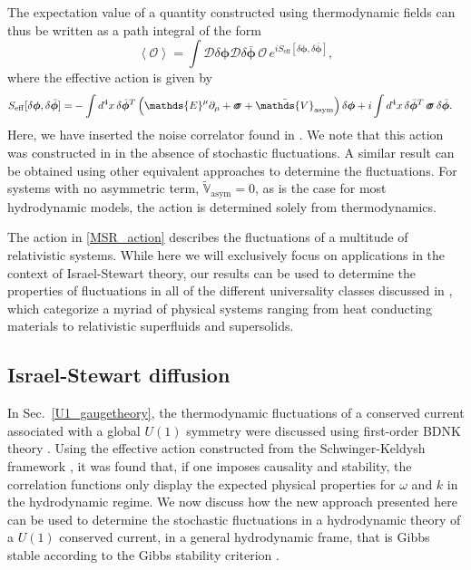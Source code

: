 \documentclass[aps,prd,nofootinbib,amsmath,amssymb,showpacs,longbibliography,singlecolumn,superscriptaddress,notitlepage]{revtex4-1}
\theoremstyle{plain}
\theoremstyle{definition}
\newcommand*{\Scale}[2][4]{\scalebox{#1}{$#2$}}%
\newcommand{\forceds}[1]{\Scale[1.1]{\ensuremath{\mathrlap{{{#1}}}\hspace{1.4pt}#1}}}
\newcommand{\cvec}[1]{\ensuremath{\bm {#1}}}
\newcommand{\cmat}[1]{\ensuremath{\mathds{{#1}}}}
\newcommand{\cmatgreek}[1]{\ensuremath{\forceds{{#1}}}}
\begin{document}
The expectation value of a quantity constructed using thermodynamic fields can thus be written as a path integral of the form 
\begin{equation}
    \left\langle \mathcal{O} \right\rangle = \int \mathcal{D} \delta \cvec{\phi} \mathcal{D} \delta \bar{\cvec{\phi}} \,\mathcal{O} \,e^{i S_{\mathrm{eff}}[\delta \cvec{\phi}, \delta \bar{\cvec{\phi}}]} ,
\end{equation}
where the effective action is given by 
\begin{equation} \label{MSR_action}
\begin{split}
    S_{\mathrm{eff}}[\delta \cvec{\phi}, \delta \bar{\cvec{\phi}}] = & -\int d^4x \,\delta \Bar{\cvec{\phi}}^T \left( \cmat{E}^{\mu} \partial_{\mu} + \cmatgreek{\sigma} + \tilde{\cmat{V}}_{\mathrm{asym}} \right) \delta \cvec{\phi} + i \int d^4x \,\delta \Bar{\cvec{\phi}}^T \,\cmatgreek{\sigma}\, \delta \bar{\cvec{\phi}} .
\end{split}
\end{equation}
Here, we have inserted the noise correlator found in \cite{Mullins:2023tjg}. We note that this action was constructed in \cite{Gavassino:2022roi} in the absence of stochastic fluctuations. A similar result can be obtained using other equivalent approaches to determine the fluctuations. For systems with no asymmetric term, $\tilde{\cmat{V}}_{\mathrm{asym}} = 0$, as is the case for most hydrodynamic models, the action is determined solely from thermodynamics.

The action in \eqref{MSR_action} describes the fluctuations of a multitude of relativistic systems. While here we will exclusively focus on applications in the context of Israel-Stewart theory, our results can be used to determine the properties of fluctuations in all of the different universality classes discussed in \cite{Gavassino:2023odx,Gavassino:2023qwl}, which categorize a myriad of physical systems ranging from heat conducting materials to relativistic superfluids and supersolids. 

\subsection{Israel-Stewart diffusion}
\label{U1_israel_stewart}

In Sec.\ \ref{U1_gaugetheory}, the thermodynamic fluctuations of a conserved current associated with a global $U(1)$ symmetry were discussed using first-order BDNK theory \cite{BemficaDisconziNoronha, Kovtun:2019hdm, Bemfica:2019knx,Bemfica:2020zjp,Hoult:2020eho}. Using the effective action constructed from the Schwinger-Keldysh framework \cite{Liu:2018kfw}, it was found that, if one imposes causality and stability, the correlation functions only display the expected physical properties for $\omega$ and $k$ in the hydrodynamic regime. We now discuss how the new approach presented here can be used to determine the stochastic fluctuations in a hydrodynamic theory of a $U(1)$ conserved current, in a general hydrodynamic frame, that is Gibbs stable according to the Gibbs stability criterion \cite{Gavassino:2021cli}.
\end{document}
